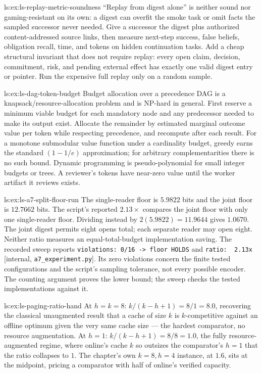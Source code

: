\begin{pdSolution}{ls:ex:ls-replay-metric-soundness}
``Replay from digest alone'' is neither sound nor gaming-resistant on its own: a digest can overfit the smoke task or omit facts the sampled successor never needed. Give a successor the digest plus authorized content-addressed source links, then measure next-step success, false beliefs, obligation recall, time, and tokens on hidden continuation tasks. Add a cheap structural invariant that does not require replay: every open claim, decision, commitment, risk, and pending external effect has exactly one valid digest entry or pointer. Run the expensive full replay only on a random sample.
\end{pdSolution}
\begin{pdSolution}{ls:ex:ls-dag-token-budget}
Budget allocation over a precedence DAG is a knapsack/resource-allocation problem and is NP-hard in general. First reserve a minimum viable budget for each mandatory node and any predecessor needed to make its output exist. Allocate the remainder by estimated marginal outcome value per token while respecting precedence, and recompute after each result. For a monotone submodular value function under a cardinality budget, greedy earns the standard $(1-1/e)$ approximation; for arbitrary complementarities there is no such bound. Dynamic programming is pseudo-polynomial for small integer budgets or trees. A reviewer's tokens have near-zero value until the worker artifact it reviews exists.
\end{pdSolution}
\begin{pdSolution}{ls:ex:ls-a7-split-floor-run}
The single-reader floor is $5.9822$ bits and the joint floor is $12.7662$ bits.
The script's reported $2.13\times$ compares the joint floor with only one
single-reader floor. Dividing instead by $2(5.9822)=11.9644$ gives $1.0670$.
The joint digest permits eight opens total; each separate reader may open
eight. Neither ratio measures an equal-total-budget implementation saving.
The recorded sweep reports \texttt{violations: 0/16 -> floor HOLDS} and
\texttt{ratio:\ \ 2.13x} [internal, \texttt{a7\_experiment.py}]. Its zero
violations concern the finite tested configurations and the script's
sampling tolerance, not every possible encoder. The counting argument
proves the lower bound; the sweep checks the tested implementations against it.
\end{pdSolution}
\begin{pdSolution}{ls:ex:ls-paging-ratio-hand}
At $h=k=8$: $k/(k-h+1)=8/1=8.0$, recovering the classical unaugmented result that a cache of size $k$ is $k$-competitive against an offline optimum given the very same cache size --- the hardest comparator, no resource augmentation. At $h=1$: $k/(k-h+1)=8/8=1.0$, the fully resource-augmented regime, where online's cache $k$ so outsizes the comparator's $h=1$ that the ratio collapses to $1$. The chapter's own $k=8,h=4$ instance, at $1.6$, sits at the midpoint, pricing a comparator with half of online's verified capacity.
\end{pdSolution}
